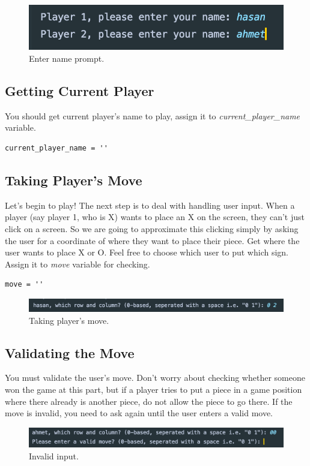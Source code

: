 \documentclass[a4paper]{article}
\begin{document}
\begin{figure}[!htb]
\centering
\includegraphics[width=1\textwidth]{enter_name.png}
\caption{Enter name prompt.}\label{fig:outputs}
\end{figure}

\subsection{Getting Current Player}
You should get current player's name to play, assign it to \textit{current\_player\_name} variable.

\begin{lstlisting} 
current_player_name = ''
\end{lstlisting}


\subsection{Taking Player's Move}
Let's begin to play! The next step is to deal with handling user input. When a player (say player 1, who is X) wants to place an X on the screen, they can’t just click on a screen. So we are going to approximate this clicking simply by asking the user for a coordinate of where they want to place their piece. Get where the user wants to place X or O. Feel free to choose which user to put which sign. Assign it to \textit{move} variable for checking.

\begin{lstlisting} 
move = ''
\end{lstlisting}

\begin{figure}[!htb]
\centering
\includegraphics[width=1\textwidth]{user_move.png}
\caption{Taking player's move.}\label{fig:outputs}
\end{figure}

\newpage
\subsection{Validating the Move}
You must validate the user's move. Don’t worry about checking whether someone won the game at this part, but if a player tries to put a piece in a game position where there already is another piece, do not allow the piece to go there. If the move is invalid, you need to ask again until the user enters a valid move.
\\
\begin{figure}[!htb]
\centering
\includegraphics[width=1\textwidth]{invalid_input.png}
\caption{Invalid input.}\label{fig:outputs}
\end{figure}
\end{document}
